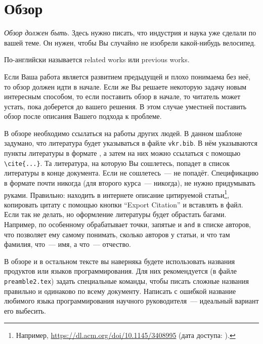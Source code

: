 
\section{Обзор}
\label{sec:relatedworks}
\emph{Обзор должен быть.} Здесь нужно писать, что индустрия и наука уже сделали по вашей теме. Он нужен, чтобы Вы случайно не изобрели какой-нибудь велосипед.

По-английски называется related works или previous works.

Если Ваша работа является развитием предыдущей и плохо понима\-ема без неё, то обзор должен идти в начале. Если же Вы решаете некоторую задачу новым интересным способом, то если поставить обзор в начале, то читатель может устать, пока доберется до вашего решения. В этом случае уместней поставить обзор после описания Вашего подхода к проблеме.

В обзоре необходимо ссылаться на работы других людей. В данном шаблоне задумано, что литература будет указываться в файле \verb=vkr.bib=. В нём указываются пункты литературы в формате \BibTeX{}, а затем на них можно ссылаться с помощью \verb=\cite{...}=. Та литература, на которую Вы сошлетесь, попадет в список литературы в конце документа. Если не сошлетесь~---  не попадёт. Спецификацию в формате \BibTeX{} почти никогда (для второго курса~--- никогда), не нужно придумывать руками. Правильно: находить в интернете описание цитируемой статьи\footnote{Например, \url{https://dl.acm.org/doi/10.1145/3408995} (дата доступа:   ).},
копировать цитату с помощью кнопки \foreignquote{english}{Export Citation} и вставлять в \BibTeX{} файл. Если так не делать, но оформление литературы будет обрастать багами.
Например, \BibTeX{} по особенному обрабатывает точ\-ки, запятые и \verb=and= в списке авторов, что позволяет ему самому понимать, сколько авторов у статьи, и что там фамилия, что~--- имя, а что~--- отчество.

В обзоре и в остальном тексте вы наверняка будете использовать названия продуктов или языков программирования. Для них рекоменду\-ется (в файле \verb=preamble2.tex=) за\-дать специальные команды, чтобы писать сложные названия правильно и одинаково по всему доку\-менту. Написать с ошибкой  название любимого языка программирова\-ния науч\-ного руко\-водителя~--- идеальный вариант его выбесить.
